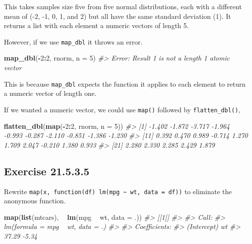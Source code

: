 \documentclass[]{book}
\newenvironment{Shaded}{\begin{snugshade}}{\end{snugshade}}
\newcommand{\CommentTok}[1]{\textcolor[rgb]{0.56,0.35,0.01}{\textit{#1}}}
\newcommand{\DataTypeTok}[1]{\textcolor[rgb]{0.13,0.29,0.53}{#1}}
\newcommand{\DecValTok}[1]{\textcolor[rgb]{0.00,0.00,0.81}{#1}}
\newcommand{\KeywordTok}[1]{\textcolor[rgb]{0.13,0.29,0.53}{\textbf{#1}}}
\newcommand{\NormalTok}[1]{#1}
\newcommand{\OperatorTok}[1]{\textcolor[rgb]{0.81,0.36,0.00}{\textbf{#1}}}
\newcommand{\StringTok}[1]{\textcolor[rgb]{0.31,0.60,0.02}{#1}}
\theoremstyle{plain}
\theoremstyle{remark}
\begin{document}
This takes samples size five from five normal distributions, each with a
different mean of (-2, -1, 0, 1, and 2) but all have the same standard
deviation (1). It returns a list with each element a numeric vectors of
length 5.

However, if we use \texttt{map\_dbl} it throws an error.

\begin{Shaded}
\begin{Highlighting}[]
\KeywordTok{map_dbl}\NormalTok{(}\OperatorTok{-}\DecValTok{2}\OperatorTok{:}\DecValTok{2}\NormalTok{, rnorm, }\DataTypeTok{n =} \DecValTok{5}\NormalTok{)}
\CommentTok{#> Error: Result 1 is not a length 1 atomic vector}
\end{Highlighting}
\end{Shaded}

This is because \texttt{map\_dbl} expects the function it applies to
each element to return a numeric vector of length one.

If we wanted a numeric vector, we could use \texttt{map()} followed by
\texttt{flatten\_dbl()},

\begin{Shaded}
\begin{Highlighting}[]
\KeywordTok{flatten_dbl}\NormalTok{(}\KeywordTok{map}\NormalTok{(}\OperatorTok{-}\DecValTok{2}\OperatorTok{:}\DecValTok{2}\NormalTok{, rnorm, }\DataTypeTok{n =} \DecValTok{5}\NormalTok{))}
\CommentTok{#>  [1] -1.402 -1.872 -3.717 -1.964 -0.993 -0.287 -2.110 -0.851 -1.386 -1.230}
\CommentTok{#> [11]  0.392  0.470  0.989 -0.714  1.270  1.709  2.047 -0.210  1.380  0.933}
\CommentTok{#> [21]  2.280  2.330  2.285  2.429  1.879}
\end{Highlighting}
\end{Shaded}

\hypertarget{exercise-21.5.3.5}{%
\subsection*{\texorpdfstring{Exercise
{21.5.3.5}}{Exercise 21.5.3.5}}\label{exercise-21.5.3.5}}

Rewrite
\texttt{map(x,\ function(df)\ lm(mpg\ \textasciitilde{}\ wt,\ data\ =\ df))}
to eliminate the anonymous function.

\begin{Shaded}
\begin{Highlighting}[]
\KeywordTok{map}\NormalTok{(}\KeywordTok{list}\NormalTok{(mtcars), }\OperatorTok{~}\StringTok{ }\KeywordTok{lm}\NormalTok{(mpg }\OperatorTok{~}\StringTok{ }\NormalTok{wt, }\DataTypeTok{data =}\NormalTok{ .))}
\CommentTok{#> [[1]]}
\CommentTok{#> }
\CommentTok{#> Call:}
\CommentTok{#> lm(formula = mpg ~ wt, data = .)}
\CommentTok{#> }
\CommentTok{#> Coefficients:}
\CommentTok{#> (Intercept)           wt  }
\CommentTok{#>       37.29        -5.34}
\end{Highlighting}
\end{Shaded}
\end{document}
